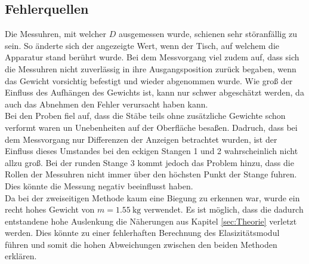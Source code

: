 \subsection{Fehlerquellen}
\label{sec:fehlerquellen}
Die Messuhren, mit welcher $D$ ausgemessen wurde, schienen sehr störanfällig zu sein. So änderte sich der angezeigte Wert, wenn der Tisch, 
auf welchem die Apparatur stand berührt wurde. Bei dem Messvorgang viel zudem auf, dass sich die Messuhren nicht zuverlässig in ihre 
Ausgangsposition zurück begaben, wenn das Gewicht vorsichtig befestigt und wieder abgenommen wurde. Wie groß der Einfluss des 
Aufhängen des Gewichts ist, kann nur schwer abgeschätzt werden, da auch das Abnehmen den Fehler verursacht haben kann. 
\\
\noindent
Bei den Proben fiel auf, dass die Stäbe teils ohne zusätzliche Gewichte schon verformt waren un Unebenheiten auf der Oberfläche besaßen. 
Dadruch, dass bei dem Messvorgang nur 
Differenzen der Anzeigen betrachtet wurden, ist der Einfluss dieses Umstandes bei den eckigen Stangen 1 und 2 wahrscheinlich nicht 
allzu groß. Bei der runden Stange 3 kommt jedoch das Problem hinzu, dass die Rollen der Messuhren nicht immer über den höchsten 
Punkt der Stange fuhren. Dies könnte die Messung negativ beeinflusst haben.
\\
\noindent
Da bei der zweiseitigen Methode kaum eine Biegung zu erkennen war, wurde ein recht hohes Gewicht von $m=\SI{1.55}{\kilo\gram}$
verwendet. Es ist möglich, dass die dadurch entstandene hohe Auslenkung die Näherungen aus Kapitel \ref{sec:Theorie} verletzt werden.
Dies könnte zu einer fehlerhaften Berechnung des Elasizitätsmodul führen und somit die hohen Abweichungen zwischen den beiden Methoden 
erklären. 